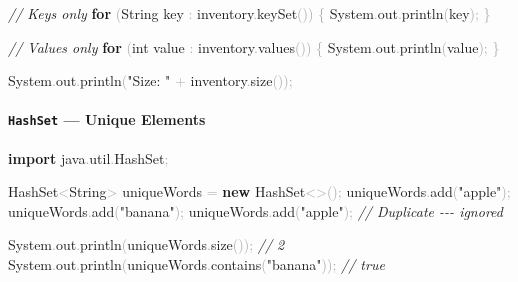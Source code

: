 \documentclass[
  justified,
  openright,
]{tufte-book}
\let\subsection\paragraph
\let\paragraph\paragraph
\newcommand{\KeywordTok}[1]{\textcolor{CodeKeyword}{\textbf{#1}}}  %
\newcommand{\StringTok}[1]{\textcolor{CodeString}{#1}}              %
\newcommand{\CommentTok}[1]{\textcolor{CodeComment}{\textit{#1}}}  %
\newcommand{\CodeFuncTok}[1]{\textcolor{CodeKeyword}{#1}}           %
\newcommand{\CodeTypeTok}[1]{\textcolor{CodeType}{#1}}              %
\newcommand{\CodeAccentTok}[1]{\textcolor{CodeAccent}{#1}}          %
\newcommand{\OperatorTok}[1]{\textcolor{DarkGray}{#1}}              %
\newenvironment{Shaded}{%
  \begin{mdframed}[style=TufteCode]%
}{%
  \end{mdframed}%
}
\let\subsection\paragraph
\let\paragraph\paragraph
\begin{document}
\begin{Shaded}
\begin{Highlighting}[]
\CommentTok{// Keys only}
\KeywordTok{for} \OperatorTok{(}String key \OperatorTok{:} inventory\OperatorTok{.}\CodeFuncTok{keySet}\OperatorTok{())} \OperatorTok{\{}
    System\OperatorTok{.}\CodeFuncTok{out}\OperatorTok{.}\CodeFuncTok{println}\OperatorTok{(}key\OperatorTok{);}
\OperatorTok{\}}
 
\CommentTok{// Values only}
\KeywordTok{for} \OperatorTok{(}\CodeTypeTok{int} value \OperatorTok{:} inventory\OperatorTok{.}\CodeFuncTok{values}\OperatorTok{())} \OperatorTok{\{}
    System\OperatorTok{.}\CodeFuncTok{out}\OperatorTok{.}\CodeFuncTok{println}\OperatorTok{(}value\OperatorTok{);}
\OperatorTok{\}}
 
System\OperatorTok{.}\CodeFuncTok{out}\OperatorTok{.}\CodeFuncTok{println}\OperatorTok{(}\StringTok{"Size: "} \OperatorTok{+} inventory\OperatorTok{.}\CodeFuncTok{size}\OperatorTok{());}
\end{Highlighting}
\end{Shaded}

\subsection{\texorpdfstring{\texttt{HashSet} --- Unique
Elements}{HashSet --- Unique Elements}}\label{hashset-unique-elements}

\begin{Shaded}
\begin{Highlighting}[]
\KeywordTok{import} \CodeAccentTok{java}\OperatorTok{.}\CodeAccentTok{util}\OperatorTok{.}\CodeAccentTok{HashSet}\OperatorTok{;}
 
HashSet\OperatorTok{\textless{}}String\OperatorTok{\textgreater{}} uniqueWords \OperatorTok{=} \KeywordTok{new} HashSet\OperatorTok{\textless{}\textgreater{}();}
uniqueWords\OperatorTok{.}\CodeFuncTok{add}\OperatorTok{(}\StringTok{"apple"}\OperatorTok{);}
uniqueWords\OperatorTok{.}\CodeFuncTok{add}\OperatorTok{(}\StringTok{"banana"}\OperatorTok{);}
uniqueWords\OperatorTok{.}\CodeFuncTok{add}\OperatorTok{(}\StringTok{"apple"}\OperatorTok{);}   \CommentTok{// Duplicate {-}{-}{-} ignored}
 
System\OperatorTok{.}\CodeFuncTok{out}\OperatorTok{.}\CodeFuncTok{println}\OperatorTok{(}uniqueWords\OperatorTok{.}\CodeFuncTok{size}\OperatorTok{());}          \CommentTok{// 2}
System\OperatorTok{.}\CodeFuncTok{out}\OperatorTok{.}\CodeFuncTok{println}\OperatorTok{(}uniqueWords\OperatorTok{.}\CodeFuncTok{contains}\OperatorTok{(}\StringTok{"banana"}\OperatorTok{));} \CommentTok{// true}
\end{Highlighting}
\end{Shaded}
\end{document}
